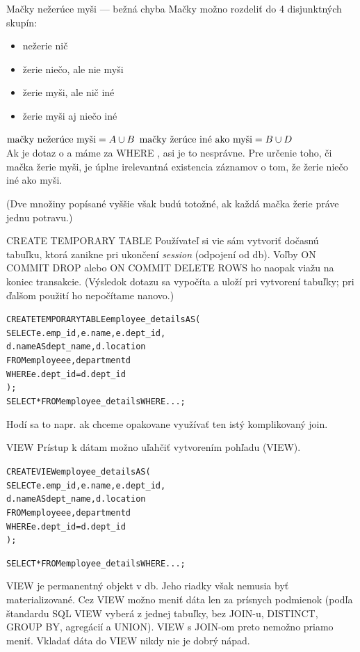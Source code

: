 \documentclass[12pt]{beamer}
\def\blue#1{\textcolor{Cerulean}{#1}}
\begin{document}
\begin{frame}[fragile]{Mačky nežerúce myši --- bežná chyba}
Mačky možno rozdeliť do 4 disjunktných skupín:
\begin{itemize}
\item[A.] nežerie nič
\item[B.] žerie niečo, ale nie myši
\item[C.] žerie myši, ale nič iné
\item[D.] žerie myši aj niečo iné
\end{itemize}
$\hbox{mačky nežerúce myši} = A\cup B$
$\hbox{mačky žerúce iné ako myši} = B\cup D$
\\[3mm]

Ak je dotaz o  a máme za WHERE , asi je to nesprávne.
Pre určenie toho, či mačka žerie myši, je úplne irelevantná existencia záznamov o tom, že žerie niečo iné ako myši.

(Dve množiny popísané vyššie však budú totožné, ak každá mačka žerie práve jednu potravu.)
\end{frame}

\begin{frame}[fragile]{CREATE TEMPORARY TABLE}
Používateľ si vie sám vytvoriť dočasnú tabuľku, ktorá zanikne pri ukončení \emph{session} (odpojení od db). Voľby ON COMMIT DROP alebo ON COMMIT DELETE ROWS ho naopak viažu na koniec transakcie.
(Výsledok dotazu sa vypočíta a uloží pri vytvorení tabuľky; pri ďalšom použití ho nepočítame nanovo.)
\begin{alltt}
\alert{CREATE TEMPORARY TABLE} \blue{employee_details} AS (
    SELECT e.emp_id, e.name, e.dept_id,
           d.name AS dept_name, d.location
    FROM employee e, department d
    WHERE e.dept_id = d.dept_id
);
SELECT * FROM \blue{employee_details} WHERE ...;
\end{alltt}
Hodí sa to napr. ak chceme opakovane využívať ten istý komplikovaný join.
\end{frame}


\begin{frame}[fragile]{VIEW}
Prístup k dátam možno uľahčiť vytvorením pohľadu (VIEW).
\begin{alltt}
\alert{CREATE VIEW} \blue{employee_details} AS (
    SELECT e.emp_id, e.name, e.dept_id,
           d.name AS dept_name, d.location
    FROM employee e, department d
    WHERE e.dept_id = d.dept_id
);

SELECT * FROM \blue{employee_details} WHERE ...;
\end{alltt}
VIEW je permanentný objekt v db. Jeho riadky však nemusia byť materializované.
Cez VIEW možno meniť dáta len za prísnych podmienok (podľa štandardu SQL VIEW vyberá z jednej tabuľky, bez JOIN-u, DISTINCT, GROUP BY, agregácií a UNION). VIEW s JOIN-om preto nemožno priamo meniť.
Vkladať dáta do VIEW nikdy nie je dobrý nápad.
\end{frame}
\end{document}
